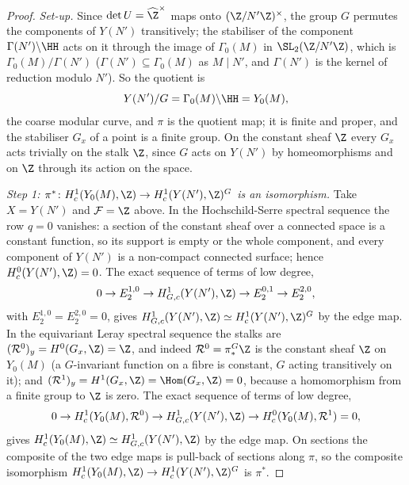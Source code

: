 \begin{proof}
\emph{Set-up.} Since $\det U=\widehat\Z^\times$ maps onto $(\Z/N'\Z)^\times$, the group $G$ permutes the components of $Y(N')$ transitively; the stabiliser of the component $\Gamma(N')\backslash\HH$ acts
on it through the image of $\Gamma_0(M)$ in $\SL_2(\Z/N'\Z)$, which is $\Gamma_0(M)/\Gamma(N')$ ($\Gamma(N')\subseteq\Gamma_0(M)$ as $M\mid N'$, and $\Gamma(N')$ is the kernel of reduction modulo $N'$). So the quotient is
\[
Y(N')/G=\Gamma_0(M)\backslash\HH=Y_0(M),
\]
the coarse modular curve, and $\pi$ is the quotient map; it is finite and proper, and the stabiliser $G_x$ of a point is a finite group. On the constant sheaf $\Z$ every $G_x$ acts
trivially on the stalk $\Z$, since $G$ acts on $Y(N')$ by homeomorphisms and on $\Z$ through its action on the space.

\emph{Step 1: $\pi^*\colon H^1_c(Y_0(M),\Z)\to H^1_c(Y(N'),\Z)^G$ is an isomorphism.} Take $X=Y(N')$ and $\mathcal F=\Z$ above. In the Hochschild-Serre spectral sequence the row $q=0$ vanishes:
a section of the constant sheaf over a connected space is a constant function, so its support is empty or the whole component, and every component of $Y(N')$ is a non-compact
connected surface; hence $H^0_c(Y(N'),\Z)=0$. The exact sequence of terms of low degree,
\[
0\to E_2^{1,0}\to H^1_{G,c}(Y(N'),\Z)\to E_2^{0,1}\to E_2^{2,0},
\]
with $E_2^{1,0}=E_2^{2,0}=0$, gives $H^1_{G,c}(Y(N'),\Z)\simeq H^1_c(Y(N'),\Z)^G$ by the edge map. In the equivariant Leray spectral sequence the stalks are $(\mathcal R^0)_y=H^0(G_x,\Z)=\Z$, and indeed
$\mathcal R^0=\pi^G_*\Z$ is the constant sheaf $\Z$ on $Y_0(M)$ (a $G$-invariant function on a fibre is constant, $G$ acting transitively on it); and $(\mathcal R^1)_y=H^1(G_x,\Z)=\Hom(G_x,\Z)=0$, because a
homomorphism from a finite group to $\Z$ is zero. The exact sequence of terms of low degree,
\[
0\to H^1_c(Y_0(M),\mathcal R^0)\to H^1_{G,c}(Y(N'),\Z)\to H^0_c(Y_0(M),\mathcal R^1)=0,
\]
gives $H^1_c(Y_0(M),\Z)\simeq H^1_{G,c}(Y(N'),\Z)$ by the edge map. On sections the composite of the two edge maps is pull-back of sections along $\pi$, so the composite isomorphism
$H^1_c(Y_0(M),\Z)\to H^1_c(Y(N'),\Z)^G$ is $\pi^*$.


\end{proof}
